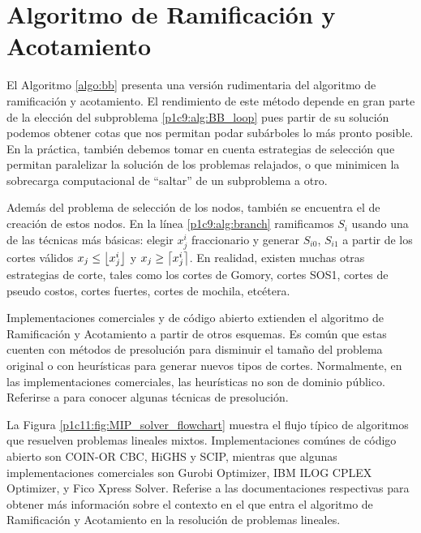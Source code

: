 \appendix

\chapter{Algoritmo de Ramificación y Acotamiento}
\label{app:bb}

\noindent
El Algoritmo \ref{algo:bb} presenta una versión rudimentaria del algoritmo de ramificación y
acotamiento. El rendimiento de este método depende en gran parte de la elección del subproblema
\eqref{p1c9:alg:BB_loop} pues partir de su solución podemos obtener cotas que nos permitan podar
subárboles lo más pronto posible. En la práctica, también debemos tomar en cuenta estrategias de
selección que permitan paralelizar la solución de los problemas relajados, o que minimicen la
sobrecarga computacional de ``saltar'' de un subproblema a otro.

Además del problema de selección de los nodos, también se encuentra el de creación de estos nodos.
En la línea \eqref{p1c9:alg:branch} ramificamos $S_i$ usando una de las técnicas más básicas: elegir
$x_j^i$ fraccionario y generar $S_{i0}$, $S_{i1}$ a partir de los cortes válidos $x_j \leq
\left\lfloor x_j^i \right\rfloor$ y $x_j \geq \left\lceil x_j^i \right\rceil$. En realidad, existen muchas otras estrategias de corte,
tales como los cortes de Gomory, cortes SOS1, cortes de pseudo costos, cortes fuertes, cortes de
mochila, etcétera.

Implementaciones comerciales y de código abierto extienden el algoritmo de Ramificación y
Acotamiento a partir de otros esquemas. Es común que estas cuenten con métodos de presolución para
disminuir el tamaño del problema original o con heurísticas para generar nuevos tipos de cortes.
Normalmente, en las implementaciones comerciales, las heurísticas no son de dominio público.
Referirse a \cite{andersen} para conocer algunas técnicas de presolución.

La Figura \ref{p1c11:fig:MIP_solver_flowchart} muestra el flujo típico de algoritmos que resuelven
problemas lineales mixtos. Implementaciones comúnes de código abierto son
COIN-OR CBC, HiGHS y SCIP, mientras que algunas implementaciones comerciales son Gurobi Optimizer,
IBM ILOG CPLEX Optimizer, y Fico Xpress Solver. Referise a las documentaciones respectivas para
obtener más información sobre el contexto en el que entra el algoritmo de Ramificación y Acotamiento
en la resolución de problemas lineales.

